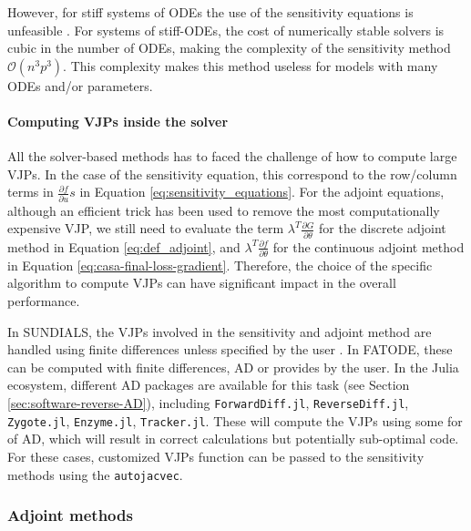 However, for stiff systems of ODEs the use of the sensitivity equations is unfeasible \cite{kim_stiff_2021}.
For systems of stiff-ODEs, the cost of numerically stable solvers is cubic in the number of ODEs\cite{hairer-solving-2}, making the complexity of the sensitivity method $\mathcal{O}(n^3p^3)$. 
This complexity makes this method useless for models with many ODEs and/or parameters. 


\paragraph{Computing VJPs inside the solver}
\label{section:computing-vjp-inside-solver}

All the solver-based methods has to faced the challenge of how to compute large VJPs. 
In the case of the sensitivity equation, this correspond to the row/column terms in $\frac{\partial f}{\partial u} s $ in Equation \eqref{eq:sensitivity_equations}.
For the adjoint equations, although an efficient trick has been used to remove the most computationally expensive VJP, we still need to evaluate the term $\lambda^T \frac{\partial G}{\partial \theta}$ for the discrete adjoint method in Equation \eqref{eq:def_adjoint}, and $\lambda^T \frac{\partial f}{\partial \theta}$ for the continuous adjoint method in Equation \eqref{eq:casa-final-loss-gradient}. 
Therefore, the choice of the specific algorithm to compute VJPs can have significant impact in the overall performance. 

In SUNDIALS, the VJPs involved in the sensitivity and adjoint method are handled using finite differences unless specified by the user \cite{SUNDIALS-hindmarsh2005sundials}.
In FATODE, these can be computed with finite differences, AD or provides by the user.
In the Julia ecosystem, different AD packages are available for this task (see Section \ref{sec:software-reverse-AD}), including \texttt{ForwardDiff.jl}, \texttt{ReverseDiff.jl}, \texttt{Zygote.jl}\cite{Innes_Zygote}, \texttt{Enzyme.jl}\cite{moses_Enzyme}, \texttt{Tracker.jl}.
These will compute the VJPs using some for of AD, which will result in correct calculations but potentially sub-optimal code. 
For these cases, customized VJPs function can be passed to the sensitivity methods using the \texttt{autojacvec}. 

\subsubsection{Adjoint methods}
\label{section:computing-adjoints}

